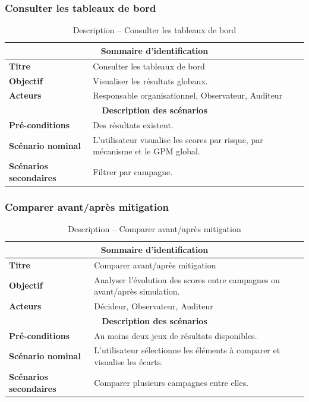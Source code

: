 \subsubsection{Consulter les tableaux de bord}
\begin{table}[H]
\centering
\renewcommand{\arraystretch}{1.3}
\begin{tabular}{@{}p{}p{}@{}}
\hline
\multicolumn{2}{c}{\textbf{Sommaire d'identification}} \\
\hline
\textbf{Titre} & Consulter les tableaux de bord \\
\textbf{Objectif} & Visualiser les résultats globaux. \\
\textbf{Acteurs} & Responsable organisationnel, Observateur, Auditeur \\
\hline
\multicolumn{2}{c}{\textbf{Description des scénarios}} \\
\hline
\textbf{Pré-conditions} & Des résultats existent. \\
\textbf{Scénario nominal} & L'utilisateur visualise les scores par risque, par mécanisme et le GPM global. \\
\textbf{Scénarios secondaires} & Filtrer par campagne. \\
\hline
\end{tabular}
\caption{Description -- Consulter les tableaux de bord}
\end{table}

\subsubsection{Comparer avant/après mitigation}
\begin{table}[H]
\centering
\renewcommand{\arraystretch}{1.3}
\begin{tabular}{@{}p{}p{}@{}}
\hline
\multicolumn{2}{c}{\textbf{Sommaire d'identification}} \\
\hline
\textbf{Titre} & Comparer avant/après mitigation \\
\textbf{Objectif} & Analyser l'évolution des scores entre campagnes ou avant/après simulation. \\
\textbf{Acteurs} & Décideur, Observateur, Auditeur \\
\hline
\multicolumn{2}{c}{\textbf{Description des scénarios}} \\
\hline
\textbf{Pré-conditions} & Au moins deux jeux de résultats disponibles. \\
\textbf{Scénario nominal} & L'utilisateur sélectionne les éléments à comparer et visualise les écarts. \\
\textbf{Scénarios secondaires} & Comparer plusieurs campagnes entre elles. \\
\hline
\end{tabular}
\caption{Description -- Comparer avant/après mitigation}
\end{table}

